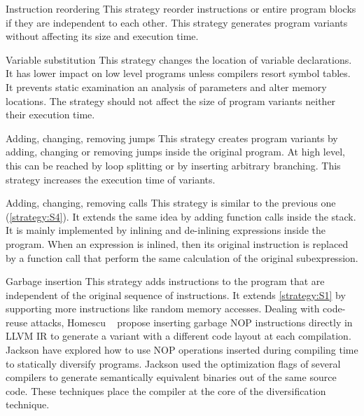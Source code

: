 \begin{strategy}{Instruction reordering}
    \label{strategy:S2}
    \normalfont
    This strategy reorder instructions or entire program blocks if they are independent to each other. This strategy generates program variants without affecting its size and execution time. 

\end{strategy}

\begin{strategy}{Variable substitution}
    \label{strategy:S3}
    \normalfont
    This strategy changes the location of variable declarations. It has lower impact on low level programs unless compilers resort symbol tables. It prevents static examination an analysis of parameters and alter memory locations. The strategy should not affect the size of program variants neither their execution time.
\end{strategy}


\begin{strategy}{Adding, changing, removing jumps}
    \label{strategy:S4}
    \normalfont
    This strategy creates program variants by adding, changing or removing jumps inside the original program. At high level, this can be reached by loop splitting or by inserting arbitrary branching. This strategy increases the execution time of variants.
\end{strategy}


\begin{strategy}{Adding, changing, removing calls}
    \label{strategy:S5}
    \normalfont
    This strategy is similar to the previous one (\autoref{strategy:S4}). It extends the same idea by adding function calls inside the stack. It is mainly implemented by inlining and de-inlining expressions inside the program. When an expression is inlined, then its original instruction is replaced by a function call that perform the same calculation of the original subexpression.
\end{strategy}


\begin{strategy}{Garbage insertion}
    \label{strategy:S6}
    \normalfont
    This strategy adds instructions to the program that are independent of the original sequence of instructions. It extends \autoref{strategy:S1} by supporting more instructions like random memory accesses.
    Dealing with code-reuse attacks, Homescu \etal~\cite{homescu2013profile} propose inserting garbage NOP instructions directly in LLVM IR to generate a variant with a different code layout at each compilation. 
    Jackson \etal \cite{jackson} have explored how to use NOP operations inserted during compiling time to statically diversify programs. Jackson \etal \cite{jackson} used  the optimization flags of several compilers to generate semantically equivalent binaries out of the same source code. These techniques place the compiler at the core of the diversification technique. %
\end{strategy}

